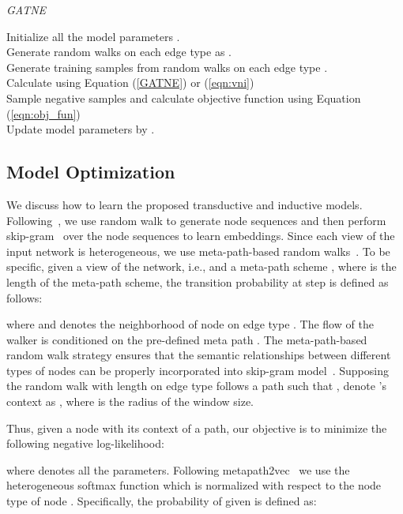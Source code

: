 \documentclass[sigconf]{acmart}
\newcommand{\model}{{\em GATNE}}
\newcommand{\hide}[1]{} \newcommand{\jie}[1]{\textbf{\color{red}[(JT: #1 )]}}  \newcommand{\vpara}[1]{\vspace{0.07in}\noindent\textbf{#1 }}
\begin{document}
\begin{algorithm}[t]
	\caption{\model \label{algo:our}}
	Initialize all the model parameters .\hide{ ,  for all nodes, and other model parameters~(, , , , , )} \\
	Generate random walks on each edge type  as . \\
	Generate training samples  from random walks  on each edge type .\\
	 {
 {
			Calculate  using Equation (\ref{GATNE}) or (\ref{eqn:vni}) \\
			Sample  negative samples and calculate objective function  using Equation (\ref{eqn:obj_fun}) \\
			Update model parameters  by .
		}
	}
\end{algorithm}


\subsection{Model Optimization}
We discuss how to learn the proposed transductive and inductive models.
Following~\cite{perozzi2014deepwalk,tang2015line,grover2016node2vec}, we use random walk to generate node sequences and then perform skip-gram~\cite{mikolov2013efficient,mikolov2013distributed} over the node sequences to learn embeddings. Since each view of the input network is heterogeneous, we use meta-path-based random walks~\cite{dong2017metapath2vec}.
To be specific, given a view  of the network, i.e.,  and a meta-path scheme , where  is the length of the meta-path scheme, the transition probability at step  is defined as follows:


\noindent where  and  denotes the neighborhood of node  on edge type . The flow of the walker is conditioned on the pre-defined meta path . The meta-path-based random walk strategy ensures that the semantic relationships between different types of nodes can be properly incorporated into skip-gram model~\cite{dong2017metapath2vec}. 
Supposing the random walk with length  on edge type  follows a path  such that , denote 's context as , where  is the radius of the window size.

Thus, given a node  with its context  of a path, our objective is to minimize the following negative log-likelihood:


\noindent where  denotes all the parameters. Following metapath2vec~\cite{dong2017metapath2vec} we use the heterogeneous softmax function which is normalized with respect to the node type of node . Specifically, the probability of  given  is defined as:
\end{document}

